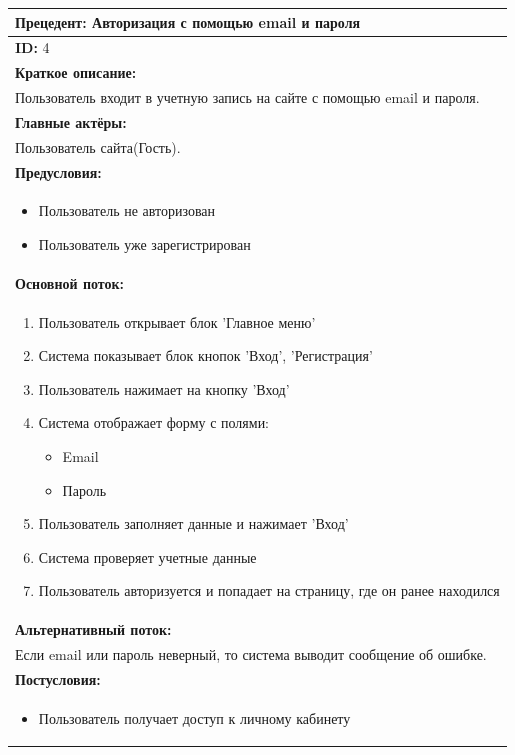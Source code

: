 \documentclass{scrreprt}
\begin{document}
\vspace{10px}
\noindent
\begin{tabularx}{\textwidth}{|X|}
	\hline
	\textbf{Прецедент: Авторизация с помощью email и пароля} \\
	\hline
	\textbf{ID:} 4 \\
	\hline
	\textbf{Краткое описание:} \\
	Пользователь входит в учетную запись на сайте с помощью email и пароля. \\
	\hline
	\textbf{Главные актёры:} \\
	Пользователь сайта(Гость). \\
	\hline
	\textbf{Предусловия:} \\
	\begin{itemize}[nosep,leftmargin=*]
		\item Пользователь не авторизован
		\item Пользователь уже зарегистрирован
	\end{itemize} \\
	\hline
	\textbf{Основной поток:} \\
	\begin{enumerate}[nosep,leftmargin=*]
		\item Пользователь открывает блок 'Главное меню'
		\item Система показывает блок кнопок 'Вход', 'Регистрация'
		\item Пользователь нажимает на кнопку 'Вход'
		\item Система отображает форму с полями:
		\begin{itemize}[nosep, leftmargin=*]
			\item Email
			\item Пароль
		\end{itemize}
		\item Пользователь заполняет данные и нажимает 'Вход'
		\item Система проверяет учетные данные
		\item Пользователь авторизуется и попадает на страницу, где он ранее находился
	\end{enumerate} \\
	\hline
	\textbf{Альтернативный поток:} \\
	Если email или пароль неверный, то система выводит сообщение об ошибке.\\
	\hline
	\textbf{Постусловия:} \\
	\begin{itemize}[nosep,leftmargin=*]
		\item Пользователь получает доступ к личному кабинету
	\end{itemize} \\
	\hline
\end{tabularx}
\end{document}
